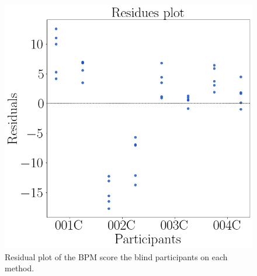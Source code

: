 \begin{figure}[!htb]
\begin{minipage}{0.45\textwidth}
        \includegraphics[width = 0.8\linewidth]{Resultados/ECG/Figuras/png/residplot_bpm_two_way_blind.png}
        \caption{Residual plot of the BPM score the blind participants on each method.}
        \label{fig:residplot_bpm_two_way}
    \end{minipage}
\end{figure}



%


\FloatBarrier